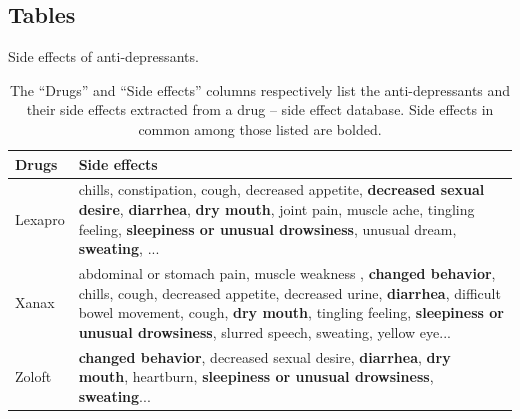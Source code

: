 \documentclass{bmcart}
\begin{document}
\begin{backmatter}
\pagebreak
\section*{Tables}
\begin{table}[h!]
  \caption{Side effects of anti-depressants.} 
  \footnotesize
  \begin{tabular}{l p{11cm}}
    \hline
    Drugs & Side effects \\ \hline
    Lexapro & chills, constipation, cough, decreased appetite, \textbf{decreased sexual desire}, \textbf{diarrhea}, \textbf{dry mouth}, joint pain, muscle ache, tingling feeling, \textbf{sleepiness or unusual drowsiness}, unusual dream, \textbf{sweating}, ... \\
    Xanax &  abdominal or stomach pain, muscle weakness
      , \textbf{changed behavior}, chills, cough, decreased appetite, decreased urine, \textbf{diarrhea}, difficult bowel movement, cough, \textbf{dry mouth}, tingling feeling, \textbf{sleepiness or unusual drowsiness}, slurred speech, sweating, yellow eye... \\
    Zoloft &  \textbf{changed behavior}, decreased sexual desire, \textbf{diarrhea}, \textbf{dry mouth}, heartburn, \textbf{sleepiness or unusual drowsiness}, \textbf{sweating}... \\ \hline
  \end{tabular}
  \caption*{The ``Drugs'' and ``Side effects'' columns respectively list the anti-depressants and their side effects extracted from a drug -- side effect database. Side effects in common among those listed are bolded.}
  \label{table:anti_depressant_side_effects}
\end{table}


\end{backmatter}
\end{document}
